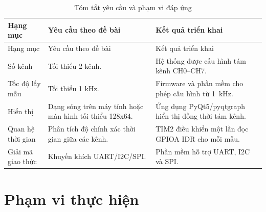 \begin{longtable}[]{@{}|
  >{\raggedright\arraybackslash}p{}
  |>{\raggedright\arraybackslash}p{}
  |>{\raggedright\arraybackslash}p{}|@{}}
\caption{Tóm tắt yêu cầu và phạm vi đáp ứng}\tabularnewline
\hline
\begin{minipage}[b]{\linewidth}\raggedright
Hạng mục
\end{minipage} & \begin{minipage}[b]{\linewidth}\raggedright
Yêu cầu theo đề bài
\end{minipage} & \begin{minipage}[b]{\linewidth}\raggedright
Kết quả triển khai
\end{minipage} \\ \hline

\endfirsthead
\hline
\begin{minipage}[b]{\linewidth}\raggedright
Hạng mục
\end{minipage} & \begin{minipage}[b]{\linewidth}\raggedright
Yêu cầu theo đề bài
\end{minipage} & \begin{minipage}[b]{\linewidth}\raggedright
Kết quả triển khai
\end{minipage} \\ \hline

\endhead

\endlastfoot
Số kênh & Tối thiểu 2 kênh. & Hệ thống được cấu hình tám kênh CH0--CH7. \\ \hline
Tốc độ lấy mẫu & Tối thiểu 1 kHz. & Firmware và phần mềm cho phép cấu hình từ 1~kHz. \\ \hline
Hiển thị & Dạng sóng trên máy tính hoặc màn hình tối thiểu 128x64. & Ứng dụng PyQt5/pyqtgraph hiển thị đồng thời tám kênh. \\ \hline
Quan hệ thời gian & Phân tích độ chính xác thời gian giữa các kênh. & TIM2 điều khiển một lần đọc GPIOA IDR cho mỗi mẫu. \\ \hline
Giải mã giao thức & Khuyến khích UART/I2C/SPI. & Phần mềm hỗ trợ UART, I2C và SPI. \\ \hline
\end{longtable}

\section{Phạm vi thực hiện}\label{phux1ea1m-vi-thux1ef1c-hiux1ec7n}

